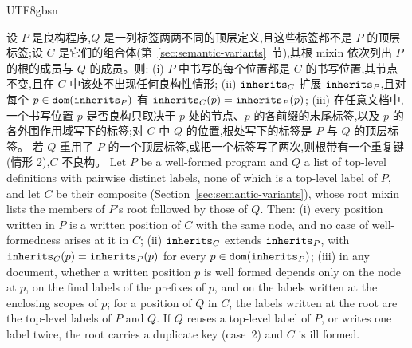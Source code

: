 \begin{CJK*}{UTF8}{gbsn}
\begin{lemma}\label{lem:composite-extension}
\ifPaperChinese
设 $P$ 是良构程序,$Q$ 是一列标签两两不同的顶层定义,且这些标签都不是 $P$ 的顶层标签;设 $C$ 是它们的组合体(第~\ref{sec:semantic-variants}~节),其根 mixin 依次列出 $P$ 的根的成员与 $Q$ 的成员。则:
(i) $P$ 中书写的每个位置都是 $C$ 的书写位置,其节点不变,且在 $C$ 中该处不出现任何良构性情形;
(ii) $\mathtt{inherits}_C$ 扩展 $\mathtt{inherits}_P$,且对每个 $p \in \mathtt{dom}(\mathtt{inherits}_P)$ 有 $\mathtt{inherits}_C(p) = \mathtt{inherits}_P(p)$;
(iii) 在任意文档中,一个书写位置 $p$ 是否良构只取决于 $p$ 处的节点、$p$ 的各前缀的末尾标签,以及 $p$ 的各外围作用域写下的标签;对 $C$ 中 $Q$ 的位置,根处写下的标签是 $P$ 与 $Q$ 的顶层标签。
若 $Q$ 重用了 $P$ 的一个顶层标签,或把一个标签写了两次,则根带有一个重复键(情形 2),$C$ 不良构。
\else
Let $P$ be a well-formed program and $Q$ a list of top-level definitions with pairwise distinct labels,
none of which is a top-level label of $P$, and let $C$ be their composite (Section~\ref{sec:semantic-variants}), whose
root mixin lists the members of $P$'s root followed by those of $Q$. Then:
(i) every position written in $P$ is a written position of $C$ with the same node, and no case of
well-formedness arises at it in $C$;
(ii) $\mathtt{inherits}_C$ extends $\mathtt{inherits}_P$, with $\mathtt{inherits}_C(p) = \mathtt{inherits}_P(p)$ for every
$p \in \mathtt{dom}(\mathtt{inherits}_P)$;
(iii) in any document, whether a written position $p$ is well formed depends only on the node at $p$,
on the final labels of the prefixes of $p$, and on the labels written at the enclosing scopes of $p$;
for a position of $Q$ in $C$, the labels written at the root are the top-level labels of $P$ and $Q$.
If $Q$ reuses a top-level label of $P$, or writes one label twice, the root carries a duplicate key
(case~2) and $C$ is ill formed.
\fi
\end{lemma}


\end{CJK*}

